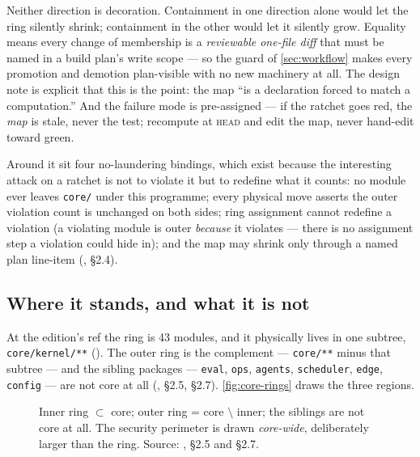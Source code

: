 \noindent Neither direction is decoration. Containment in one direction alone would
let the ring silently shrink; containment in the other would let it silently grow.
Equality means every change of membership is a \emph{reviewable one-file diff} that
must be named in a build plan's write scope --- so the guard of
\autoref{sec:workflow} makes every promotion and demotion plan-visible with no new
machinery at all. The design note is explicit that this is the point: the map ``is
a declaration forced to match a computation.'' And the failure mode is pre-assigned
--- if the ratchet goes red, the \emph{map} is stale, never the test; recompute at
\textsc{head} and edit the map, never hand-edit toward green.

Around it sit four no-laundering bindings, which exist because the interesting
attack on a ratchet is not to violate it but to redefine what it counts: no module
ever leaves \texttt{core/} under this programme; every physical move asserts the
outer violation count is unchanged on both sides; ring assignment cannot redefine a
violation (a violating module is outer \emph{because} it violates --- there is no
assignment step a violation could hide in); and the map may shrink only through a
named plan line-item (, \S 2.4).

\subsection*{Where it stands, and what it is not}

At the edition's ref the ring is 43 modules, and it physically lives in one
subtree, \texttt{core/kernel/**}
().
The outer ring is the complement --- \texttt{core/**} minus that subtree --- and the
sibling packages
--- \texttt{eval}, \texttt{ops}, \texttt{agents}, \texttt{scheduler},
\texttt{edge}, \texttt{config} --- are not core at all
(, \S 2.5, \S 2.7). \autoref{fig:core-rings} draws
the three regions.

\begin{figure}[t]
  \centering
  
  \caption[The three code regions]{Inner ring $\subset$ core; outer ring = core
    $\setminus$ inner; the siblings are not core at all. The security perimeter is
    drawn \emph{core-wide}, deliberately larger than the ring. Source:
    , \S 2.5 and \S 2.7.}
  \label{fig:core-rings}
\end{figure}

